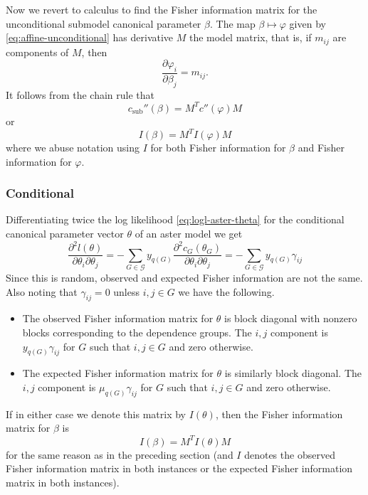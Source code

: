 Now we revert to calculus to find the Fisher information matrix for the
unconditional submodel canonical parameter $\beta$.
The map $\beta \mapsto \varphi$ given by \eqref{eq:affine-unconditional}
has derivative $M$ the model matrix, that is, if $m_{i j}$ are components
of $M$, then
$$
   \frac{\partial{\varphi_i}}{\partial \beta_j} = m_{i j}.
$$
It follows from the chain rule that
$$
   c_\text{sub}''(\beta) = M^T c''(\varphi) M
$$
or
$$
   I(\beta) = M^T I(\varphi) M
$$
where we abuse notation using $I$ for both Fisher information for $\beta$
and Fisher information for $\varphi$.

\subsubsection{Conditional}

Differentiating twice the log likelihood \eqref{eq:logl-aster-theta} for
the conditional canonical parameter vector $\theta$ of
an aster model we get
$$
   \frac{\partial^2 l(\theta)}{\partial \theta_i \partial \theta_j}
   =
   - \sum_{G \in \mathcal{G}} y_{q(G)}
   \frac{\partial^2 c_G(\theta_G)}{\partial \theta_i \partial \theta_j}
   =
   - \sum_{G \in \mathcal{G}} y_{q(G)} \gamma_{i j}
$$
Since this is random, observed and expected Fisher information are not
the same.  Also noting that $\gamma_{i j} = 0$ unless $i, j \in G$ we have
the following.
\begin{itemize}
\item The observed Fisher information matrix for $\theta$ is block diagonal
    with nonzero blocks corresponding to the dependence groups.  The $i, j$
    component is $y_{q(G)} \gamma_{i j}$ for $G$ such that $i, j \in G$ and
    zero otherwise.
\item The expected Fisher information matrix for $\theta$ is similarly
    block diagonal.  The $i, j$
    component is $\mu_{q(G)} \gamma_{i j}$ for $G$ such that $i, j \in G$ and
    zero otherwise.
\end{itemize}

If in either case we denote this matrix by $I(\theta)$, then
the Fisher information matrix for $\beta$ is
$$
   I(\beta) = M^T I(\theta) M
$$
for the same reason as in the preceding section (and $I$ denotes the observed
Fisher information matrix in both instances or the expected
Fisher information matrix in both instances).

